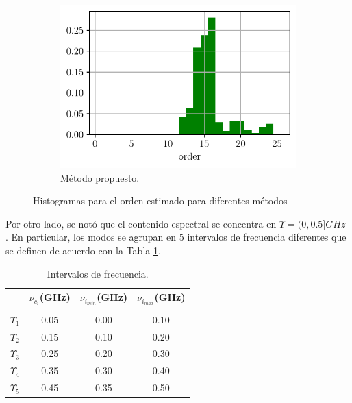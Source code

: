 \begin{figure}
\begin{subfigure}{0.3\linewidth}
                \includegraphics[width = \linewidth]{Figuras/orden_mio_UWB.pdf}
                \caption{Método propuesto.}
            \end{subfigure}
            \caption{Histogramas para el orden estimado para diferentes métodos}
            \label{fig:Hist_cil}
        \end{figure}

        
    Por otro lado, se notó que el contenido espectral se concentra en $\Upsilon = (0,0.5] GHz$ . En particular, los modos se agrupan en  $5$ intervalos de frecuencia diferentes que se definen de acuerdo con la Tabla \ref{Table:segments}.

	\begin{table}[ht]
		\centering
		{\begin{tabular*}{20pc}{@{\extracolsep{\fill}}cccc@{}}
				& $\nu_{c_i}$(GHz)       & $\nu_{i_{min}}$(GHz)      & $\nu_{i_{max}}$(GHz) \\ \hline \\[-0.9em] 
				
				$\Upsilon_1$   & 0.05 & 0.00 & 0.10  \\ 
				$\Upsilon_2$   & 0.15 & 0.10 & 0.20  \\ 
				$\Upsilon_3$   & 0.25 & 0.20 & 0.30 \\ 
				$\Upsilon_4$   & 0.35 & 0.30 & 0.40   \\ 
				$\Upsilon_5$   & 0.45 & 0.35 & 0.50   \\ \hline	
		\end{tabular*}}{}
		\caption{Intervalos de frecuencia.}\label{Table:segments}
	\end{table}

